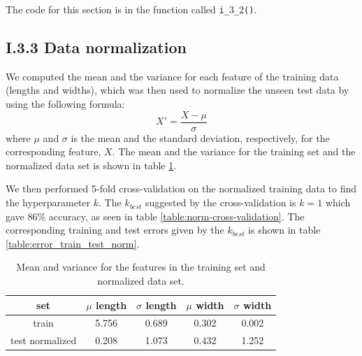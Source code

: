\documentclass[12pt]{article}
\begin{document}
  The code for this section is in the function called \texttt{i\_$3$\_$2$()}.

\subsection*{I.3.3 Data normalization}

  We computed the mean and the variance for each feature of the training data (lengths and widths), which was then used to normalize the unseen test data by using the following formula: 
  $$ X' = \frac{X - \mu}{\sigma}$$
  where $\mu$ and $\sigma$ is the mean and the standard deviation, respectively, for the corresponding feature, $X$. The mean and the variance for the training set and the normalized data set is shown in table \ref{table:mean_var_train_norm}. 

  We then performed 5-fold cross-validation on the normalized training data to find the hyperparameter $k$. The $k_{best}$ suggested by the cross-validation is $k = 1$ which gave 86\% accuracy, as seen in table \ref{table:norm-cross-validation}. The corresponding training and test errors given by the $k_{best}$ is shown in table \ref{table:error_train_test_norm}.

  \begin{table}[h]
    \centering
    \begin{tabular}{| c | c | c | c | c |}
      \hline
        set & $\mu$ length & $\sigma$ length & $\mu$ width & $\sigma$ width \\
      \hline
        train           & 5.756 & 0.689 & 0.302 & 0.002 \\
        test normalized & 0.208 & 1.073 & 0.432 & 1.252 \\
      \hline
    \end{tabular}
    \caption{Mean and variance for the features in the training set and normalized data set.}
    \label{table:mean_var_train_norm}
  \end{table}
\end{document}
